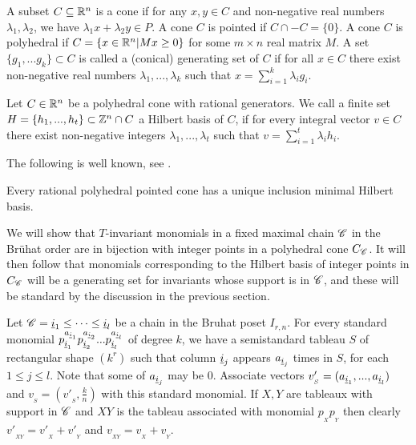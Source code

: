 \begin{definition}[Cone]
    A  subset \(C \subseteq  \mathbb{R}^n\) is a cone if for any \(x,y\in C\) and non-negative real numbers \(\lambda_1,\lambda_2\), we have \(\lambda_1 x + \lambda_2 y \in P\). A cone \(C\) is pointed if \(C \cap -C = \{0\}\). 
    A cone \(C\) is polyhedral if \(C = \{ x \in \mathbb{R}^n | Mx \ge 0\}\) for some $m \times n$ real matrix \(M\). 
    A set $\{g_1,...g_k\} \subset C$ is called a (conical) generating set  of \(C\) if for all \(x \in C\) there exist non-negative real numbers \(\lambda_1,...,\lambda_k\) such that \(x = \sum_{i=1}^k \lambda_i g_i\).
\end{definition}

\begin{definition}
    Let \(C \in \mathbb{R}^n\) be a polyhedral cone with rational generators. 
    We call a finite set \(H = \{h_1,...,h_t\} \subset \mathbb{Z}^n \cap C\) a Hilbert basis of $C$,
   if for every integral vector $v \in C$ there exist non-negative integers \(\lambda_1,...,\lambda_t\) such that 
    $v=\sum_{i=1}^t \lambda_i h_i.$ 
  \end{definition} 
  
  The following is well known, see \cite[Theorem 16.4]{schrijver1998theory}.   
 \begin{proposition}
Every rational polyhedral pointed cone has a unique inclusion minimal Hilbert basis.
 \end{proposition}
 
We will show that $T$-invariant monomials in a fixed maximal chain $\mathscr{C}$ in the Br\"{u}hat order are in bijection with integer points in a polyhedral cone $C_{\mathscr{C}}$. It will then follow that monomials corresponding to the Hilbert basis of integer points in $C_{\mathscr{C}}$ will be a generating set for invariants whose support is in $\mathscr{C}$, and these will be standard by the discussion in the previous section.

Let \(\mathscr{C} = {\underline{i}_1} \le \cdots \le  {\underline{i}_l}\) be a chain in the Bruhat poset \(I_{r,n}\). For every standard monomial \(p_{\underline{i}_1}^{a_{\underline{i}_1}}p_{\underline{i}_2}^{a_{\underline{i}_2}}...p_{\underline{i}_l}^{a_{\underline{i}_l}}\) of degree \(k\), we have a semistandard tableau \(S\) of rectangular shape \((k^r)\) such that column \(\underline{i}_j\) appears \(a_{\underline{i}_j}\) times in \(S\), for  each \(1 \le j \le l\). Note that some of \(a_{{\underline i}_j}\) may be \(0\). 
Associate vectors \(v'_{_S} = (a_{\underline{i}_1},...,a_{\underline{i}_l})\) and \(v_{_S} = (v'_{_S},\frac{k}{n})\) with this standard monomial.
If \(X,Y\) are tableaux with support in \(\mathscr{C}\)  and \(XY\) is the tableau associated with monomial \(p_{_X}p_{_Y}\) then clearly \(v'_{_{XY}} = v'_{_X} + v'_{_Y}\) and \(v_{_{XY}} = v_{_X}+v_{_Y}\).

